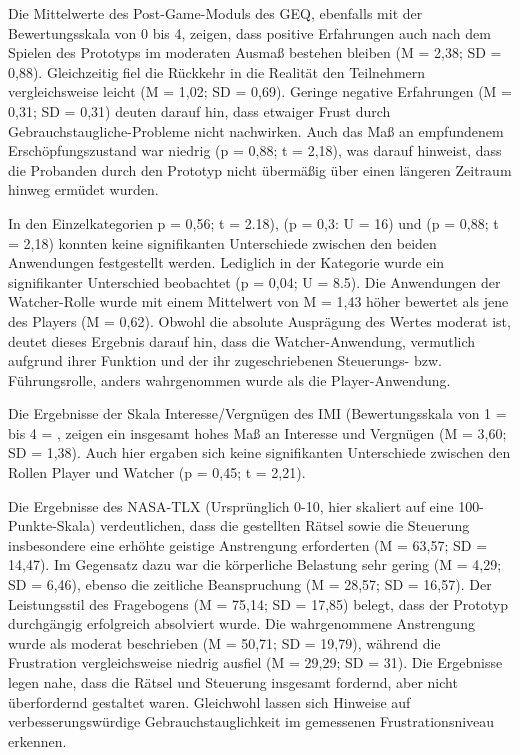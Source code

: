 Die Mittelwerte des Post-Game-Moduls des \ac{GEQ}, ebenfalls mit der Bewertungsskala von 0 bis 4, zeigen, dass positive Erfahrungen auch nach dem Spielen des Prototyps im moderaten Ausmaß bestehen bleiben (M = 2,38; SD = 0,88). Gleichzeitig fiel die Rückkehr in die Realität den Teilnehmern vergleichsweise leicht (M = 1,02; SD = 0,69). Geringe negative Erfahrungen (M = 0,31; SD = 0,31) deuten darauf hin, dass etwaiger Frust durch Gebrauchstaugliche-Probleme nicht nachwirken. Auch das Maß an empfundenem Erschöpfungszustand war niedrig (p = 0,88; t = 2,18), was darauf hinweist, dass die Probanden durch den Prototyp nicht übermäßig über einen längeren Zeitraum hinweg ermüdet wurden.

In den Einzelkategorien  p = 0,56; t = 2.18),  (p = 0,3: U = 16) und  (p = 0,88; t = 2,18) konnten keine signifikanten Unterschiede zwischen den beiden Anwendungen festgestellt werden. Lediglich in der Kategorie  wurde ein signifikanter Unterschied beobachtet (p = 0,04; U = 8.5). Die Anwendungen der Watcher-Rolle wurde mit einem Mittelwert von M = 1,43 höher bewertet als jene des Players (M = 0,62). Obwohl die absolute Ausprägung des Wertes moderat ist, deutet dieses Ergebnis darauf hin, dass die Watcher-Anwendung, vermutlich aufgrund ihrer Funktion und der ihr zugeschriebenen Steuerungs- bzw. Führungsrolle, anders wahrgenommen wurde als die Player-Anwendung.

Die Ergebnisse der Skala Interesse/Vergnügen des \ac{IMI} (Bewertungsskala von 1 =  bis 4 = , zeigen ein insgesamt hohes Maß an Interesse und Vergnügen (M = 3,60; SD = 1,38). Auch hier ergaben sich keine signifikanten Unterschiede zwischen den Rollen Player und Watcher (p = 0,45; t = 2,21). 

Die Ergebnisse des \ac{NASA-TLX} (Ursprünglich 0-10, hier skaliert auf eine 100-Punkte-Skala) verdeutlichen, dass die gestellten Rätsel sowie die Steuerung insbesondere eine erhöhte geistige Anstrengung erforderten (M = 63,57; SD = 14,47). Im Gegensatz dazu war die körperliche Belastung sehr gering  (M = 4,29; SD = 6,46), ebenso die zeitliche Beanspruchung (M = 28,57; SD = 16,57). Der Leistungsstil des Fragebogens (M = 75,14; SD = 17,85) belegt, dass der Prototyp durchgängig erfolgreich absolviert wurde. Die wahrgenommene Anstrengung wurde als moderat beschrieben (M = 50,71; SD = 19,79),  während die Frustration vergleichsweise niedrig ausfiel  (M = 29,29; SD = 31). Die Ergebnisse legen nahe, dass die Rätsel und Steuerung insgesamt fordernd, aber nicht überfordernd gestaltet waren. Gleichwohl lassen sich Hinweise auf verbesserungswürdige Gebrauchstauglichkeit im gemessenen Frustrationsniveau erkennen.

